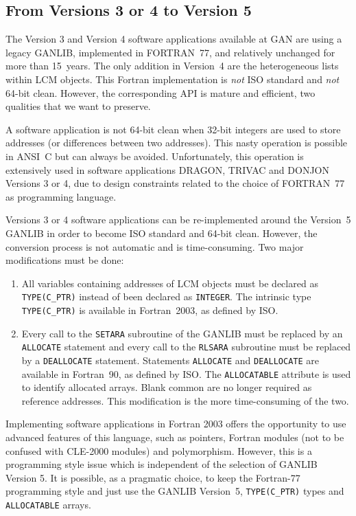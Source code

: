 \vskip 0.8cm

\subsection {From Versions 3 or 4 to Version 5}

The Version 3 and Version 4 software applications available at GAN are using a legacy GANLIB, implemented in FORTRAN~77,
and relatively unchanged for more than 15~years.\cite{lcm1994} The only addition in Version~4 are the heterogeneous lists within LCM
objects. This Fortran implementation is {\sl not} ISO standard and {\sl not} 64-bit clean. However, the corresponding API
is mature and efficient, two qualities that we want to preserve.

\vskip 0.08cm

A software application is not 64-bit clean when 32-bit integers are used to store addresses (or differences between
two addresses). This nasty operation is possible in ANSI~C but can always be avoided. Unfortunately, this operation
is extensively used in software applications DRAGON, TRIVAC and DONJON Versions 3 or 4, due to design constraints
related to the choice of FORTRAN~77 as programming language.

\vskip 0.08cm

Versions 3 or 4 software applications can be re-implemented around the Version~5 GANLIB in order to become ISO standard and 64-bit clean.
However, the conversion process is not automatic and is time-consuming. Two major modifications must be done:
\begin{enumerate}
\item All variables containing addresses of LCM objects must be declared as {\tt TYPE(C\_PTR)} instead of been
declared as {\tt INTEGER}. The intrinsic type {\tt TYPE(C\_PTR)} is available in Fortran~2003, as defined by ISO.
\item Every call to the {\tt SETARA} subroutine of the GANLIB must be replaced by an {\tt ALLOCATE} statement and every call to the {\tt RLSARA}
subroutine must be replaced by a {\tt DEALLOCATE} statement. Statements {\tt ALLOCATE}  and {\tt DEALLOCATE} are
available in Fortran~90, as defined by ISO. The {\tt ALLOCATABLE} attribute is used to identify allocated arrays. Blank common
are no longer required as reference addresses. This modification
is the more time-consuming of the two.
\end{enumerate}

\vskip 0.08cm

Implementing software applications in Fortran 2003 offers the opportunity to use advanced features of this language, such
as pointers, Fortran modules (not to be confused with CLE-2000 modules) and polymorphism. However, this is a programming
style issue which is independent of the selection of GANLIB Version 5. It is possible, as a pragmatic choice, to keep the Fortran-77 programming style
and just use the GANLIB Version~5, {\tt TYPE(C\_PTR)} types and {\tt ALLOCATABLE} arrays.

